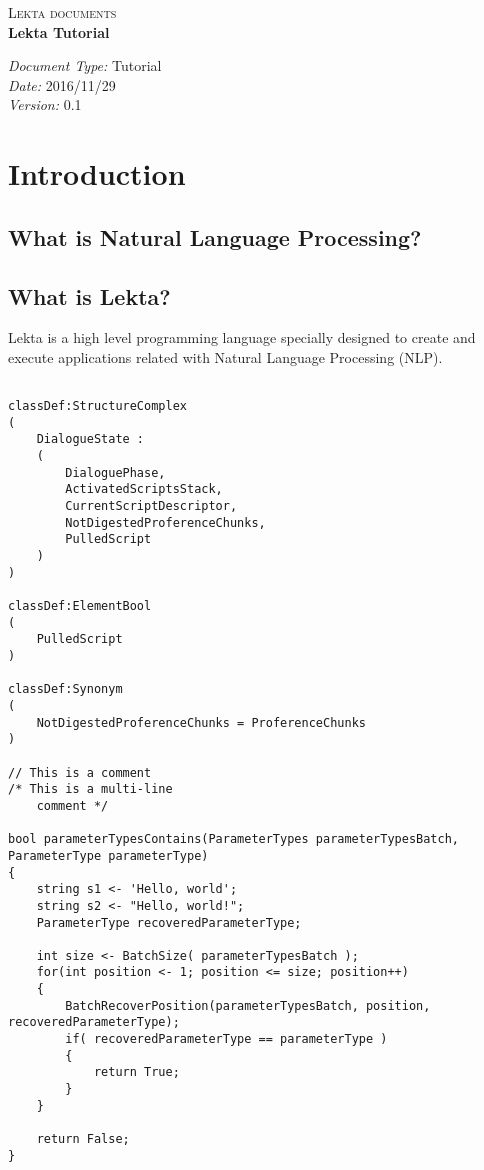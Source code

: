 \documentclass[a4paper,10pt]{article}
\begin{document}
\large
\begin{center}
\textsc{Lekta documents} \\

\LARGE
\vspace{24pt}
\textbf{Lekta Tutorial}
\vspace{24pt}
\end{center}

\normalsize
\begin{flushleft}
\emph{Document Type:} Tutorial \\
\emph{Date:} 2016/11/29 \\
\emph{Version:} 0.1
\end{flushleft}

\vspace{24pt}
\section{Introduction}

\subsection{What is Natural Language Processing?}


\subsection{What is Lekta?}

Lekta is a high level programming language specially designed to create and execute applications 
related with Natural Language Processing (NLP).

\begin{lstlisting}[language=lekta]

classDef:StructureComplex 
(
	DialogueState : 
	(
		DialoguePhase,
		ActivatedScriptsStack,
		CurrentScriptDescriptor,
		NotDigestedProferenceChunks,
		PulledScript
	)
)

classDef:ElementBool
(
	PulledScript
)

classDef:Synonym
(
	NotDigestedProferenceChunks = ProferenceChunks
)

// This is a comment
/* This is a multi-line
	comment */
	
bool parameterTypesContains(ParameterTypes parameterTypesBatch, ParameterType parameterType)
{
	string s1 <- 'Hello, world';
	string s2 <- "Hello, world!";
	ParameterType recoveredParameterType;

	int size <- BatchSize( parameterTypesBatch );
	for(int position <- 1; position <= size; position++)
	{
		BatchRecoverPosition(parameterTypesBatch, position, recoveredParameterType);
		if( recoveredParameterType == parameterType )
		{
			return True;
		}
	}
	
	return False;
}
\end{lstlisting}
\end{document}
